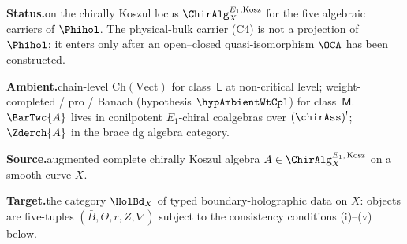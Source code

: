 \begin{theorem}
\label{thm:typed-boundary-holographic-realisation}
%
%
%

\noindent\textbf{Status.}\enspace \ClaimStatusProvedHere on the chirally
Koszul locus $\ChirAlg_{X}^{E_{1},\mathrm{Kosz}}$ for the five
algebraic carriers of $\Phihol$.  The physical-bulk carrier
\textup{(C4)} is not a projection of $\Phihol$; it enters only after
an open--closed quasi-isomorphism $\OCA$ has been constructed.

\noindent\textbf{Ambient.}\enspace chain-level $\mathrm{Ch}(\mathrm{Vect})$
for class~$\mathsf{L}$ at non-critical level; weight-completed / pro /
Banach (hypothesis $\hypAmbientWtCpl$) for class~$\mathsf{M}$.
$\BarTwc{A}$ lives in conilpotent $E_{1}$-chiral coalgebras over
$(\chirAss)^{!}$; $\Zderch{A}$ in the brace dg algebra category.

\noindent\textbf{Source.}\enspace augmented complete chirally Koszul
algebra $A \in \ChirAlg_{X}^{E_{1},\,\mathrm{Kosz}}$ on a smooth curve
$X$.

\noindent\textbf{Target.}\enspace the category $\HolBd_{X}$ of typed
boundary-holographic data on $X$: objects are five-tuples
$(\bar{B}, \Theta, r, Z, \nabla)$ subject to the consistency conditions
\textup{(i)--(v)} below.


\end{theorem}

